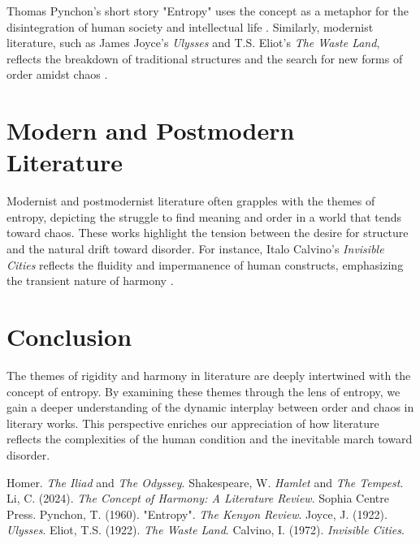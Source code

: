 \documentclass{article}
\begin{document}
Thomas Pynchon's short story "Entropy" uses the concept as a metaphor for the 
disintegration of human society and intellectual life \cite{pynchon}. 
Similarly, modernist literature, such as James Joyce's \textit{Ulysses} and 
T.S. Eliot's \textit{The Waste Land}, reflects the breakdown of traditional 
structures and the search for new forms of order amidst chaos \cite{joyce}.

\section{Modern and Postmodern Literature}
Modernist and postmodernist literature often grapples with the themes of 
entropy, depicting the struggle to find meaning and order in a world that 
tends toward chaos. These works highlight the tension between the desire for 
structure and the natural drift toward disorder. For instance, Italo Calvino's 
\textit{Invisible Cities} reflects the fluidity and impermanence of human 
constructs, emphasizing the transient nature of harmony \cite{calvino}.

\section{Conclusion}
The themes of rigidity and harmony in literature are deeply intertwined with 
the concept of entropy. By examining these themes through the lens of entropy, 
we gain a deeper understanding of the dynamic interplay between order and 
chaos in literary works. This perspective enriches our appreciation of how 
literature reflects the complexities of the human condition and the inevitable 
march toward disorder.

\begin{thebibliography}{9}
 Homer. \textit{The Iliad} and \textit{The Odyssey}.
 Shakespeare, W. \textit{Hamlet} and \textit{The Tempest}.
 Li, C. (2024). \textit{The Concept of Harmony: A Literature Review}. Sophia Centre Press.
 Pynchon, T. (1960). "Entropy". \textit{The Kenyon Review}.
 Joyce, J. (1922). \textit{Ulysses}. Eliot, T.S. (1922). \textit{The Waste Land}.
 Calvino, I. (1972). \textit{Invisible Cities}.
\end{thebibliography}
\end{document}
